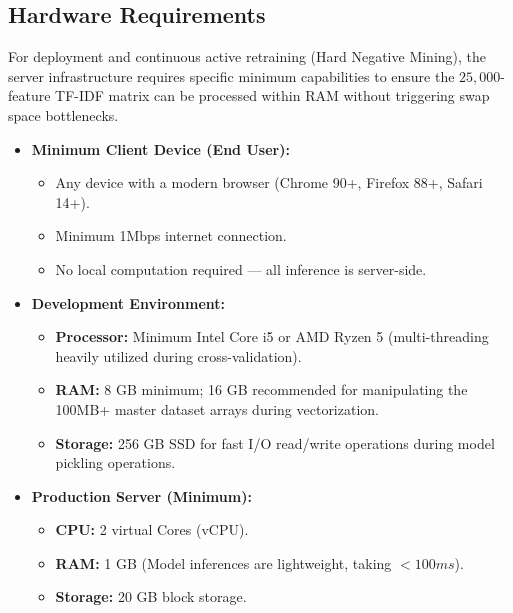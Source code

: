 \subsection{Hardware Requirements}
For deployment and continuous active retraining (Hard Negative Mining), the server infrastructure requires specific minimum capabilities to ensure the $25,000$-feature TF-IDF matrix can be processed within RAM without triggering swap space bottlenecks.
\begin{itemize}
    \item \textbf{Minimum Client Device (End User):}
    \begin{itemize}
        \item Any device with a modern browser (Chrome 90+, Firefox 88+, Safari 14+).
        \item Minimum 1Mbps internet connection.
        \item No local computation required --- all inference is server-side.
    \end{itemize}
    \item \textbf{Development Environment:}
    \begin{itemize}
        \item \textbf{Processor:} Minimum Intel Core i5 or AMD Ryzen 5 (multi-threading heavily utilized during cross-validation).
        \item \textbf{RAM:} 8 GB minimum; 16 GB recommended for manipulating the 100MB+ master dataset arrays during vectorization.
        \item \textbf{Storage:} 256 GB SSD for fast I/O read/write operations during model pickling operations.
    \end{itemize}
    \item \textbf{Production Server (Minimum):}
    \begin{itemize}
        \item \textbf{CPU:} 2 virtual Cores (vCPU).
        \item \textbf{RAM:} 1 GB (Model inferences are lightweight, taking $<100ms$).
        \item \textbf{Storage:} 20 GB block storage.
    \end{itemize}
\end{itemize}

